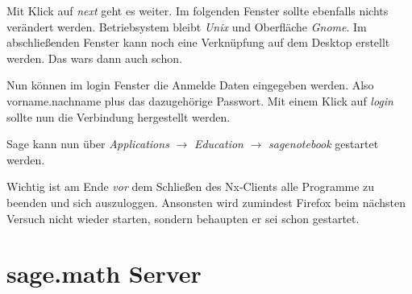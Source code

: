 \documentclass[a4paper,10pt,DIV15]{scrartcl}
\begin{document}
Mit Klick auf \emph{next} geht es weiter. Im folgenden Fenster sollte ebenfalls nichts verändert werden.
 Betriebsystem bleibt \emph{Unix} und Oberfläche \emph{Gnome}. 
Im abschließenden Fenster kann noch eine Verknüpfung auf dem Desktop erstellt werden. Das wars dann auch schon.

Nun können im login Fenster die Anmelde Daten eingegeben werden. Also vorname.nachname plus das dazugehörige Passwort. Mit einem Klick auf 
\emph{login} sollte nun die Verbindung hergestellt werden. 

Sage kann nun über \emph{Applications} $\to$ \emph{Education} $\to$ \emph{sagenotebook} gestartet werden. 

Wichtig ist am Ende \emph{vor} dem Schließen des Nx-Clients alle Programme zu beenden und sich auszuloggen. Ansonsten wird zumindest Firefox beim
nächsten Versuch nicht wieder starten, sondern behaupten er sei schon gestartet. 
\section{sage.math Server}
\end{document}
